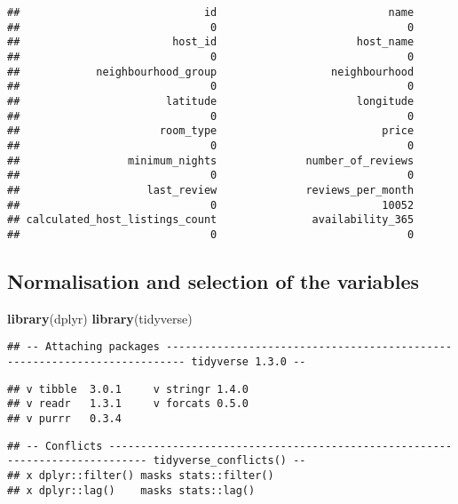 \documentclass[
]{article}
\newenvironment{Shaded}{\begin{snugshade}}{\end{snugshade}}
\newcommand{\KeywordTok}[1]{\textcolor[rgb]{0.13,0.29,0.53}{\textbf{#1}}}
\newcommand{\NormalTok}[1]{#1}
\begin{document}
\begin{verbatim}
##                             id                           name 
##                              0                              0 
##                        host_id                      host_name 
##                              0                              0 
##            neighbourhood_group                  neighbourhood 
##                              0                              0 
##                       latitude                      longitude 
##                              0                              0 
##                      room_type                          price 
##                              0                              0 
##                 minimum_nights              number_of_reviews 
##                              0                              0 
##                    last_review              reviews_per_month 
##                              0                          10052 
## calculated_host_listings_count               availability_365 
##                              0                              0
\end{verbatim}

\hypertarget{normalisation-and-selection-of-the-variables}{%
\subsection{Normalisation and selection of the
variables}\label{normalisation-and-selection-of-the-variables}}

\begin{Shaded}
\begin{Highlighting}[]
\KeywordTok{library}\NormalTok{(dplyr)}
\KeywordTok{library}\NormalTok{(tidyverse)}
\end{Highlighting}
\end{Shaded}

\begin{verbatim}
## -- Attaching packages ------------------------------------------------------------------------- tidyverse 1.3.0 --
\end{verbatim}

\begin{verbatim}
## v tibble  3.0.1     v stringr 1.4.0
## v readr   1.3.1     v forcats 0.5.0
## v purrr   0.3.4
\end{verbatim}

\begin{verbatim}
## -- Conflicts ---------------------------------------------------------------------------- tidyverse_conflicts() --
## x dplyr::filter() masks stats::filter()
## x dplyr::lag()    masks stats::lag()
\end{verbatim}
\end{document}
